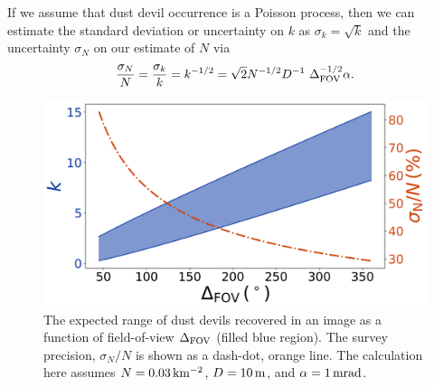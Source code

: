 \documentclass{aastex63}
\begin{document}
If we assume that dust devil occurrence is a Poisson process, then we can estimate the standard deviation or uncertainty on $k$ as $\sigma_k = \sqrt{k}$ and the uncertainty $\sigma_N$ on our estimate of $N$ via
\begin{equation}
    \frac{\sigma_N}{N} = \frac{\sigma_k}{k} = k^{-1/2} = \sqrt{2} N^{-1/2} D^{-1}\ \Delta_{\rm FOV}^{-1/2} \alpha.
    \label{eqn:sigma_N}
\end{equation}

\begin{figure}
    \centering
    \includegraphics[width=\textwidth]{figures/DDs_vs_Delta.jpg}
    \caption{The expected range of dust devils recovered in an image as a function of field-of-view $\Delta_{\rm FOV}$ (filled blue region). The survey precision, $\sigma_N/N$ is shown as a dash-dot, orange line. The calculation here assumes $N = 0.03\,{\rm km^{-2}}$, $D = 10\,{\rm m}$, and $\alpha = 1\,{\rm mrad}$.}
    \label{fig:DDs_vs_Delta}
\end{figure}

\end{document}

